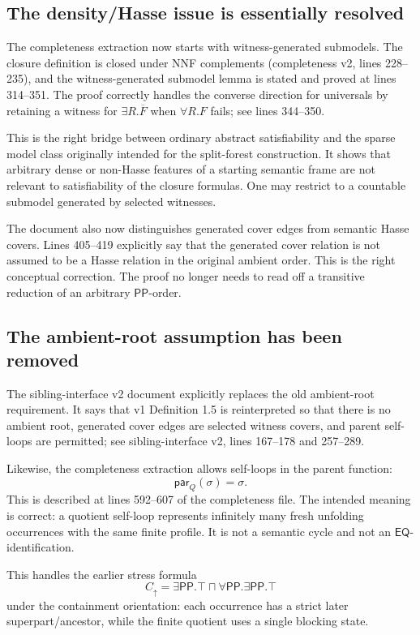 \documentclass[11pt]{article}
\newcommand{\PP}{\mathsf{PP}}
\newcommand{\EQ}{\mathsf{EQ}}
\newcommand{\parQ}{\mathsf{par}_Q}
\begin{document}
\subsection{The density/Hasse issue is essentially resolved}

The completeness extraction now starts with witness-generated submodels.  The
closure definition is closed under NNF complements
(completeness v2, lines 228--235), and the
witness-generated submodel lemma is stated and proved at lines 314--351.  The
proof correctly handles the converse direction for universals by retaining a
witness for \(\exists R.\overline F\) when \(\forall R.F\) fails; see lines
344--350.

This is the right bridge between ordinary abstract satisfiability and the sparse
model class originally intended for the split-forest construction.  It shows
that arbitrary dense or non-Hasse features of a starting semantic frame are not
relevant to satisfiability of the closure formulas.  One may restrict to a
countable submodel generated by selected witnesses.

The document also now distinguishes generated cover edges from semantic Hasse
covers.  Lines 405--419 explicitly say that the generated cover relation is not
assumed to be a Hasse relation in the original ambient order.  This is the
right conceptual correction.  The proof no longer needs to read off a transitive
reduction of an arbitrary \(\PP\)-order.

\subsection{The ambient-root assumption has been removed}

The sibling-interface v2 document explicitly replaces the old ambient-root
requirement.  It says that v1 Definition 1.5 is reinterpreted so that there is
no ambient root, generated cover edges are selected witness covers, and parent
self-loops are permitted; see
sibling-interface v2, lines 167--178 and 257--289.

Likewise, the completeness extraction allows self-loops in the parent function:
\[
  \parQ(\sigma)=\sigma .
\]
This is described at lines 592--607 of the completeness file.  The intended
meaning is correct: a quotient self-loop represents infinitely many fresh
unfolding occurrences with the same finite profile.  It is not a semantic cycle
and not an \(\EQ\)-identification.

This handles the earlier stress formula
\[
  C_\uparrow = \exists\PP.\top \sqcap \forall\PP.\exists\PP.\top
\]
under the containment orientation: each occurrence has a strict later
superpart/ancestor, while the finite quotient uses a single blocking state.
\end{document}
